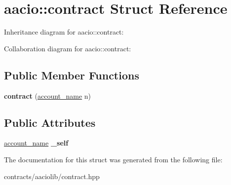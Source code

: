 \hypertarget{structaacio_1_1contract}{}\section{aacio\+:\+:contract Struct Reference}
\label{structaacio_1_1contract}


Inheritance diagram for aacio\+:\+:contract\+:


Collaboration diagram for aacio\+:\+:contract\+:
\subsection*{Public Member Functions}
\begin{DoxyCompactItemize}
\item 
\mbox{\label{structaacio_1_1contract_af5d350618f24bbf2c3c8562930655bba}} 
{\bfseries contract} (\mbox{\hyperlink{structaacio_1_1chain_1_1name}{account\+\_\+name}} n)
\end{DoxyCompactItemize}
\subsection*{Public Attributes}
\begin{DoxyCompactItemize}
\item 
\mbox{\label{structaacio_1_1contract_a38fd53853874e3a962431e5be18f145a}} 
\mbox{\hyperlink{structaacio_1_1chain_1_1name}{account\+\_\+name}} {\bfseries \+\_\+self}
\end{DoxyCompactItemize}


The documentation for this struct was generated from the following file\+:\begin{DoxyCompactItemize}
\item 
contracts/aaciolib/contract.\+hpp\end{DoxyCompactItemize}
